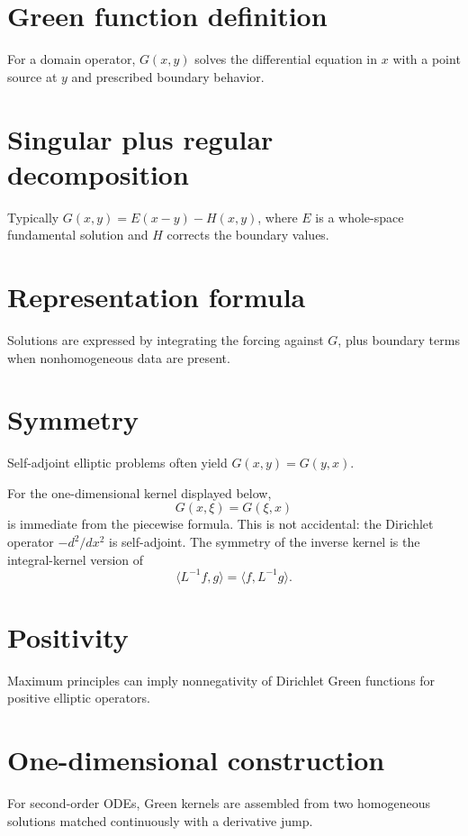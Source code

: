 \section{Green function definition}
For a domain operator, $G(x,y)$ solves the differential equation in $x$ with a point source at $y$ and prescribed boundary behavior.

\section{Singular plus regular decomposition}
Typically $G(x,y)=E(x-y)-H(x,y)$, where $E$ is a whole-space fundamental solution and $H$ corrects the boundary values.

\section{Representation formula}
Solutions are expressed by integrating the forcing against $G$, plus boundary terms when nonhomogeneous data are present.

\section{Symmetry}
Self-adjoint elliptic problems often yield $G(x,y)=G(y,x)$.


\begin{example}\label{ex:iii25-expand-02}
For the one-dimensional kernel displayed below,
\[
G(x,\xi)=G(\xi,x)
\]
is immediate from the piecewise formula. This is not accidental: the
Dirichlet operator \(-d^2/dx^2\) is self-adjoint. The symmetry of the inverse
kernel is the integral-kernel version of
\[
\langle L^{-1}f,g\rangle=\langle f,L^{-1}g\rangle.
\]
\end{example}
\section{Positivity}
Maximum principles can imply nonnegativity of Dirichlet Green functions for positive elliptic operators.

\section{One-dimensional construction}
For second-order ODEs, Green kernels are assembled from two homogeneous solutions matched continuously with a derivative jump.


